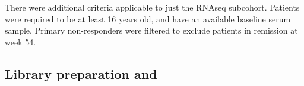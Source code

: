 \begin{outline}
%
There were additional criteria applicable to just the \gls{RNAseq} subcohort.
Patients were required to be at least 16 years old, and have an available baseline serum sample.
Primary non-responders were filtered to exclude patients in remission at week 54.

\subsection{Library preparation and }


\end{outline}
